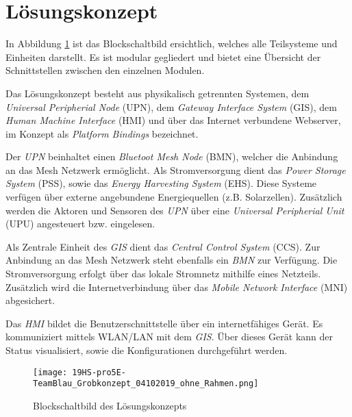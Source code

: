 \clearpage
\section{Lösungskonzept}\label{sec:Loesungskonzept}
In Abbildung \ref{img:Grobkonzept} ist das Blockschaltbild ersichtlich, welches alle Teilsysteme und Einheiten darstellt. Es ist modular gegliedert und bietet eine Übersicht der Schnittstellen zwischen den einzelnen Modulen. 

Das Lösungskonzept besteht aus physikalisch getrennten Systemen, dem \textit{Universal Peripherial Node} (UPN), dem \textit{Gateway Interface System} (GIS), dem \textit{Human Machine Interface} (HMI) und über das Internet verbundene Webserver, im Konzept als \textit{Platform Bindings} bezeichnet.  

Der \textit{UPN} beinhaltet einen \textit{Bluetoot Mesh Node} (BMN), welcher die Anbindung an das Mesh Netzwerk ermöglicht. Als Stromversorgung dient das \textit{Power Storage System} (PSS), sowie das \textit{Energy Harvesting System} (EHS). Diese Systeme verfügen über externe angebundene Energiequellen (z.B. Solarzellen). Zusätzlich werden die Aktoren und Sensoren des \textit{UPN} über eine \textit{Universal Peripherial Unit} (UPU) angesteuert bzw. eingelesen.

Als Zentrale Einheit des \textit{GIS} dient das \textit{Central Control System} (CCS). Zur Anbindung an das Mesh Netzwerk steht ebenfalls ein \textit{BMN} zur Verfügung. Die Stromversorgung erfolgt über das lokale Stromnetz mithilfe eines Netzteils. Zusätzlich wird die Internetverbindung über das \textit{Mobile Network Interface} (MNI) abgesichert. 

Das \textit{HMI} bildet die Benutzerschnittstelle über ein internetfähiges Gerät. Es kommuniziert mittels WLAN/LAN mit dem \textit{GIS}. Über dieses Gerät kann der Status visualisiert, sowie die Konfigurationen durchgeführt werden.



\begin{figure}
	\centering
	\texttt{[image: 19HS-pro5E-TeamBlau\_Grobkonzept\_04102019\_ohne\_Rahmen.png]}
	\caption{Blockschaltbild des Lösungskonzepts}
	\label{img:Grobkonzept}
\end{figure} 








